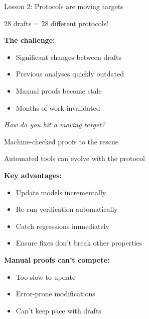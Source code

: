 \documentclass[aspectratio=169, lualatex, handout]{beamer}
\begin{document}
\begin{frame}{Lesson 2: Protocols are moving targets}
	\begin{center}
		\Large
		28 drafts = 28 different protocols!
	\end{center}
	\vspace{1em}
	\textbf{The challenge:}
	\begin{itemize}
		\item Significant changes between drafts
		\item Previous analyses quickly outdated
		\item Manual proofs become stale
		\item Months of work invalidated
	\end{itemize}
	\vspace{0.5em}
	\begin{center}
		\textit{How do you hit a moving target?}
	\end{center}
\end{frame}

\begin{frame}{Machine-checked proofs to the rescue}
	\begin{center}
		\Large
		Automated tools can evolve with the protocol
	\end{center}
	\vspace{1em}
	\textbf{Key advantages:}
	\begin{itemize}
		\item Update models incrementally
		\item Re-run verification automatically
		\item Catch regressions immediately
		\item Ensure fixes don't break other properties
	\end{itemize}
	\vspace{0.5em}
	\textbf{Manual proofs can't compete:}
	\begin{itemize}
		\item Too slow to update
		\item Error-prone modifications
		\item Can't keep pace with drafts
	\end{itemize}
\end{frame}
\end{document}

